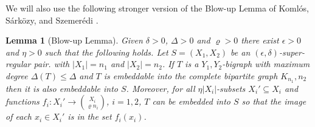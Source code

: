 \documentclass[oneside,12pt]{memoir}
\newtheorem{lemma}[theorem]{Lemma}
\newcommand{\ep}{\epsilon}
\begin{document}
We will also use the following stronger version of the Blow-up Lemma of Koml\'{o}s, S\'{a}rk\"{o}zy, and Szemer\'{e}di \cite{KSSbu}.


\begin{lemma}[Blow-up Lemma]\label{blowup}
Given $\delta >0$, $\Delta >0$ and $\varrho>0$ there exist $\ep >0$ and $\eta>0$ such that the following holds. Let $S=(X_1, X_2)$ be an $(\ep ,\delta )$-super-regular pair. with $|X_1|=n_{1}$ and $|X_2|=n_{2}$. 
If $T$ is a $Y_1, Y_2$-bigraph with maximum degree $\Delta (T)\leq\Delta $ and $T$ is embeddable into the complete bipartite graph $K_{n_1},{n_2}$ then it is also embeddable into $S$.  Moreover, for all $\eta |X_i|$-subsets $X_i'\subseteq X_i$ and functions $f_{i}:X_{i}'\rightarrow \binom{X_{i}}{\varrho n_{i}}$, $i=1,2$, $T$ can be embedded into $S$ so that the image of each $x_{i}\in X_{i}'$ is in the set $f_{i}\left( x_{i}\right)$.
\end{lemma}


\end{document}
